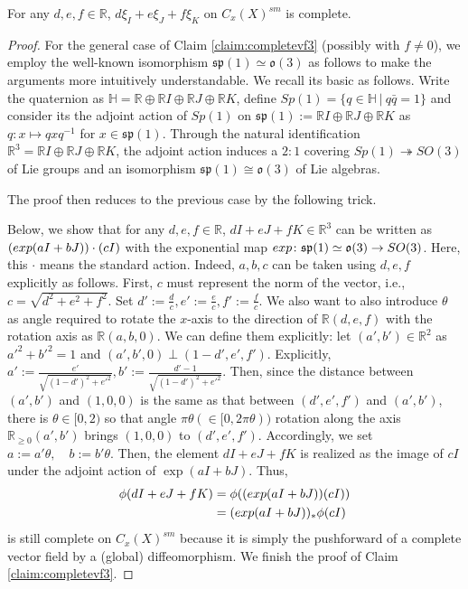 \documentclass[10pt,a4paper]{amsart}
\def\R{\mathbb{R}}
\begin{document}
\begin{Claim}\label{claim:completevf3}
For any $d,e,f\in \R$, 
$d\xi_I+e\xi_J+f\xi_K$ on $C_x(X)^{sm}$ is complete. 
\end{Claim}

\begin{proof}
For the general case of Claim \ref{claim:completevf3} 
(possibly with $f \neq 0$), we employ the well-known isomorphism 
$\mathfrak{sp}(1) \simeq \mathfrak{o}(3)$ as follows
to make the arguments more intuitively 
understandable. 
We recall its basic as follows. 
Write the quaternion as $\mathbb{H} = \R \oplus \R I \oplus \R J \oplus \R K$, 
define $Sp(1) = \{q \in \mathbb{H}\: \vert \: q\bar{q} = 1\}$ and consider its 
the adjoint action of $Sp(1)$ on $\mathfrak{sp}(1) :=\R I \oplus \R J \oplus \R K$ as $q\colon x \mapsto qxq^{-1}$ for $x \in \mathfrak{sp}(1)$. 
Through the natural identification $\R^3 = \R I \oplus \R J \oplus \R K$, 
the adjoint action induces a $2:1$ 
covering $Sp(1) \twoheadrightarrow SO(3)$ of Lie groups and an isomorphism 
$\mathfrak{sp}(1) \cong \mathfrak{o}(3)$ of Lie algebras.

The proof then reduces to the previous case by the 
following trick. 

Below, we show 
that for any $d,e,f\in \R$, 
$dI+eJ+fK \in \R^3$ can be written as 
$({\rm exp}(aI+bJ))\cdot (cI)$ with the exponential map 
${\rm exp}\colon \mathfrak{sp}(1)\simeq \mathfrak{o}(3)
\to SO(3)$. Here, this $\cdot$ means the standard 
action. 
Indeed, $a,b,c$ can be taken using $d,e,f$ explicitly as follows. 
First, $c$ must represent the norm of the vector, i.e., 
$c = \sqrt{d^2 + e^2 + f^2}$. Set $d':=\frac{d}{c}, e':=\frac{e}{c}, 
f':=\frac{f}{c}$. 
We also want to also introduce $\theta$ as angle required to rotate the $x$-axis 
to the direction of $\R(d, e, f)$ with 
the rotation axis as $\R(a,b,0)$. 
We can define them explicitly: 
let $(a',b')\in \R^2$ as 
$a'^2+b'^2=1$ and $(a',b',0)\perp (1-
d',e',f')$. Explicitly, 
$a':=\frac{e'}{\sqrt{(1-d')^2+e'^2}}, 
b':=\frac{d'-1}{\sqrt{(1-d')^2+e'^2}}$. 
Then, since the distance between 
$(a',b')$ and $(1,0,0)$ is the same as 
that between $(d',e',f')$ and $(a',b')$, 
there is $\theta\in [0,2)$ 
so that angle $\pi\theta (\in [0, 2\pi\theta))$ rotation 
along the axis $\R_{\ge 0}(a',b')$ brings 
$(1,0,0)$ to $(d',e',f')$. Accordingly, 
we set 
$a:= a' \theta, \quad b:=b' \theta$. 
Then, the element $dI+eJ+fK$ is realized 
as the image of $cI$ 
under the adjoint action of $\exp(aI+bJ)$. 
Thus, 
\begin{align*}
\phi(dI+eJ+fK)&=\phi(({\rm exp}(aI+bJ))(cI))\\
&=({\rm exp}(aI+bJ))_*\phi(cI)
\end{align*}
is still complete on $C_x(X)^{sm}$ because 
it is simply the pushforward of a complete vector field by a (global) 
diffeomorphism. We finish the proof of 
Claim \ref{claim:completevf3}. 
\end{proof}
\end{document}
